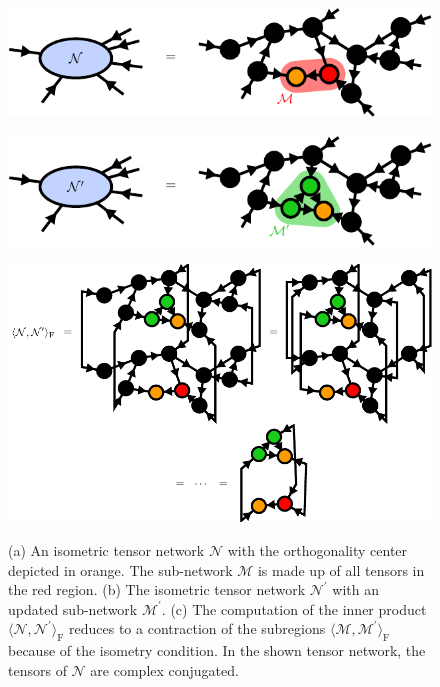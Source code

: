 \begin{figure}
	\centering
	\subcaptionbox{\label{fig:isometric_tensor_network_N}}
	{%
		\includegraphics[scale=1]{figures/tikz/Tensor_Networks/contractions_of_isometric_tensor_networks/contractions_of_isometric_tensor_networks_a.pdf}
	}
	\par\bigskip
	\subcaptionbox{\label{fig:isometric_tensor_network_N_prime}}
	{%
		\includegraphics[scale=1]{figures/tikz/Tensor_Networks/contractions_of_isometric_tensor_networks/contractions_of_isometric_tensor_networks_b.pdf}
	}
	\par\bigskip
	\subcaptionbox{\label{fig:isometric_tensor_network_norm_contraction}}
	{%
		\includegraphics[scale=1]{figures/tikz/Tensor_Networks/contractions_of_isometric_tensor_networks/contractions_of_isometric_tensor_networks_c.pdf}
	}
	\caption{(a) An isometric tensor network $\mathcal{N}$ with the orthogonality center depicted in orange. The sub-network $\mathcal{M}$ is made up of all tensors in the red region. (b) The isometric tensor network $\mathcal{N}^\prime$ with an updated sub-network $\mathcal{M}^\prime$. (c) The computation of the inner product $\langle\mathcal{N},\mathcal{N}^\prime\rangle_\text{F}$ reduces to a contraction of the subregions $\langle\mathcal{M},\mathcal{M}^\prime\rangle_\text{F}$ because of the isometry condition. In the shown tensor network, the tensors of $\mathcal{N}$ are complex conjugated.}
	\label{fig:isometric_tensor_network_local_approximation}
\end{figure}